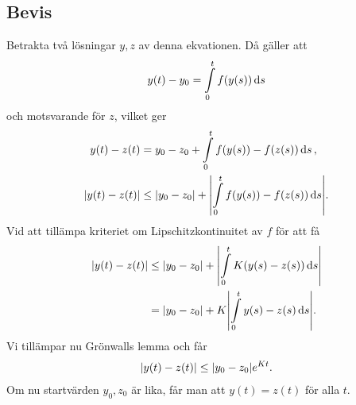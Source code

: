 \subsection{Bevis}
Betrakta två lösningar $y, z$ av denna ekvationen. Då gäller att
\begin{align*}
	y(t) - y_0 = \int\limits_{0}^{t}f(y(s))\dd{s}
\end{align*}
och motsvarande för $z$, vilket ger
\begin{align*}
	y(t) - z(t)       &= y_0 - z_0 + \int\limits_{0}^{t}f(y(s)) - f(z(s))\dd{s}, \\
	\abs{y(t) - z(t)} &\leq \abs{y_0 - z_0} + \abs{\int\limits_{0}^{t}f(y(s)) - f(z(s))\dd{s}}.
\end{align*}
Vid att tillämpa kriteriet om Lipschitzkontinuitet av $f$ för att få
\begin{align*}
	\abs{y(t) - z(t)} &\leq \abs{y_0 - z_0} + \abs{\int\limits_{0}^{t}K(y(s) - z(s))\dd{s}} \\
	                  &= \abs{y_0 - z_0} + K\abs{\int\limits_{0}^{t}y(s) - z(s)\dd{s}}.
\end{align*}
Vi tillämpar nu Grönwalls lemma och får
\begin{align*}
	\abs{y(t) - z(t)} \leq \abs{y_0 - z_0}e^{Kt}.
\end{align*}
Om nu startvärden $y_0, z_0$ är lika, får man att $y(t) = z(t)$ för alla $t$.